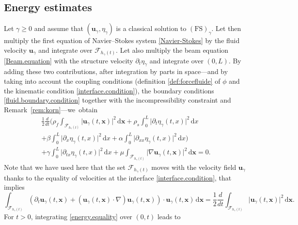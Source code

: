 \documentclass[11pt]{article}
\let\mathcal\mathscr
\newcommand{\FS}{\mathrm{FS}}
\theoremstyle{remark}
\theoremstyle{definition}
\newcommand{\ug}{\boldsymbol{u}}
\newcommand{\xg}{\boldsymbol{x}}
\newcommand{\dd}{\,\mathrm{d}}
\begin{document}
\subsection{Energy estimates}
Let $\gamma \geq 0 $ and assume that $(\ug_\gamma, \eta_\gamma)$ is a classical solution to $(\FS)_{\gamma}$. Let then multiply the first equation of Navier--Stokes system \eqref{Navier-Stokes} by the fluid velocity $\ug_\gamma$ and integrate over $\mathcal{F}_{h_\gamma(t)}$. Let also multiply the beam equation \eqref{Beam.equation} with the structure velocity $\partial_t\eta_{\gamma}$ and integrate over $(0, L)$. By adding these two contributions, after integration by parts in space---and by taking into account the coupling conditions (definition \eqref{def:forcefluide} of $\phi$ and the kinematic condition \eqref{interface.condition}), the boundary conditions \eqref{fluid.boundary.condition} together with the incompressibility constraint and Remark~\ref{rem:korn}---we~obtain
\begin{multline}\label{energy.equality}
\frac{1}{2}\frac{d}{dt}\biggl(\rho_{f}\int_{\mathcal{F}_{h_{\gamma}(t)}}\vert\ug_{\gamma}(t, \xg) \vert^{2} \dd\xg+ \rho_{s}\int_{0}^{L}\vert\partial_{t}\eta_{\gamma}(t, x) \vert^{2}\dd x \\
 +\beta\int_{0}^{L}\vert\partial_{x}\eta_{\gamma}(t, x) \vert^{2}\dd x+\alpha\int_{0}^{L}\vert\partial_{xx}\eta_{\gamma}(t, x)\vert^{2} \dd x\biggr)\\
 +\gamma\int_{0}^{L}\vert\partial_{tx}\eta_{\gamma}(t, x)\vert^{2} \dd x+ \mu\int_{\mathcal{F}_{h_{\gamma}(t)}}\vert \nabla\ug_{\gamma}(t, \xg) \vert^{2}\dd \xg=0.
\end{multline}
Note that we have used here that the set ${\mathcal{F}_{h_{\gamma}(t)}}$ moves with the velocity field $\ug_{\gamma}$ thanks to the equality of velocities at the interface \eqref{interface.condition}, that implies
\[
\int_{\mathcal{F}_{h_{\gamma}(t)}}(\partial_t\ug_\gamma(t, \xg)+(\ug_{\gamma}(t, \xg)\cdot\nabla )\ug_{\gamma}(t, \xg))\cdot \ug_{\gamma}(t, \xg)\dd\xg = \frac{1}{2}\frac{d}{dt}\int_{\mathcal{F}_{h_{\gamma}(t)}}\vert\ug_{\gamma}(t, \xg) \vert^{2} \dd\xg.
\]
For $t >0$, integrating \eqref{energy.equality} over $(0, t)$ leads to
\end{document}
